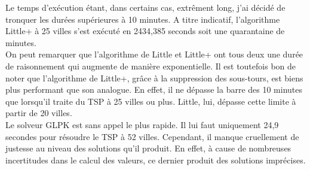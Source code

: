 \documentclass[a4paper]{article}
\begin{document}
Le temps d'exécution étant, dans certains cas, extrêment long, j'ai décidé de tronquer les durées supérieures à 10 minutes. A titre indicatif, l'algorithme Little+ à 25 villes s'est exécuté en 2434,385 seconds soit une quarantaine de minutes.\\

On peut remarquer que l'algorithme de Little et Little+ ont tous deux une durée de raisonnement qui augmente de manière exponentielle. Il est toutefois bon de noter que l'algorithme de Little+, grâce à la suppression des sous-tours, est biens plus performant que son analogue. En effet, il ne dépasse la barre des 10 minutes que lorsqu'il traite du TSP à 25 villes ou plus. Little, lui, dépasse cette limite à partir de 20 villes.\\
Le solveur GLPK est sans appel le plus rapide. Il lui faut uniquement 24,9 secondes pour résoudre le TSP à 52 villes. Cependant, il manque cruellement de justesse au niveau des solutions qu'il produit. En effet, à cause de nombreuses incertitudes dans le calcul des valeurs, ce dernier produit des solutions imprécises.
\end{document}
